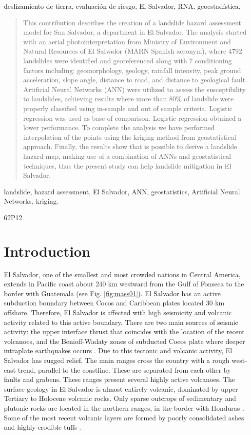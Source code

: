 \documentclass[11pt,twoside]{rmta2010eng}%
\begin{document}
\PC deslizamiento de tierra, evaluaci\'{o}n de riesgo, El Salvador, RNA, geoestad\'{i}stica.

\begin{abstract}
This contribution describes the creation of a landslide hazard
assessment model for San Salvador, a department in El Salvador. The analysis started with an aerial photointerpretation from Ministry of Environment and Natural Resources of El Salvador (MARN Spanish acronym), where 4792 landslides were identified and georeferenced 
along with 7 conditioning factors including: geomorphology, geology, rainfall intensity, peak ground acceleration, slope angle, distance to road, and distance to geological fault. Artificial Neural Networks (ANN) were utilized to assess the susceptibility to
landslides, achieving results where more than 80\% of landslide were properly classified using
in-sample and out of sample criteria. Logistic regression was used as base of
comparison. Logistic regression obtained a lower performance. To complete the analysis we have
performed interpolation of the points using the kriging method from geostatistical
approach. Finally, the results show that is possible to derive a landslide hazard map, making use of a combination of ANNs and geostatistical techniques, thus the present study can help landslide mitigation in El Salvador.
\end{abstract}

\KW landslide, hazard assessment, El Salvador, ANN, geostatistics, Artificial Neural Networks, kriging.

\AMS 62P12.%



\section{Introduction}
\label{sec:intr}
El Salvador, one of the smallest and most crowded nations in Central America, extends in Pacific coast about 240 km westward from the Gulf of Fonseca to the border with Guatemala (see Fig. \ref{fig:mass01}). El Salvador has an active subduction boundary between Cocos and Caribbean plates located 30 km offshore. Therefore, El Salvador is affected with high seismicity and volcanic activity related to this active boundary. There are two main sources of seismic activity: the upper interface thrust that coincides with the location of the recent volcanoes, and the Benioff-Wadaty zones of subducted Cocos plate where deeper intraplate earthquakes occurs \cite{dewey}. Due to this tectonic and volcanic activity, El Salvador has rugged relief. The main ranges cross the country with a rough west-east trend, parallel to the coastline. These are separated from each other by faults and grabens. These ranges present several highly active volcanoes. The surface geology in El Salvador is almost entirely volcanic, dominated by upper Tertiary to Holocene volcanic rocks. Only sparse outcrops of sedimentary and plutonic rocks are located in the northern ranges, in the border with Honduras \cite{weber}. Some of the most recent volcanic layers are formed by poorly consolidated ashes and highly erodible tuffs \cite{bommer}.
\end{document}
